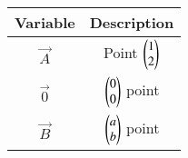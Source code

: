 \begin{tabular}[12pt]{ |c| c|}
    \hline
    \textbf{Variable} & \textbf{Description}\\ 
    \hline
	$\vec{A}$ & Point $\begin{pmatrix}1\\2\end{pmatrix}$\\
    \hline
	$\vec{0}$ & $\begin{pmatrix}0\\0\end{pmatrix}$ point\\
    \hline
	$\vec{B}$ & $\begin{pmatrix}a\\b\end{pmatrix}$ point\\
    \hline

    \end{tabular}
